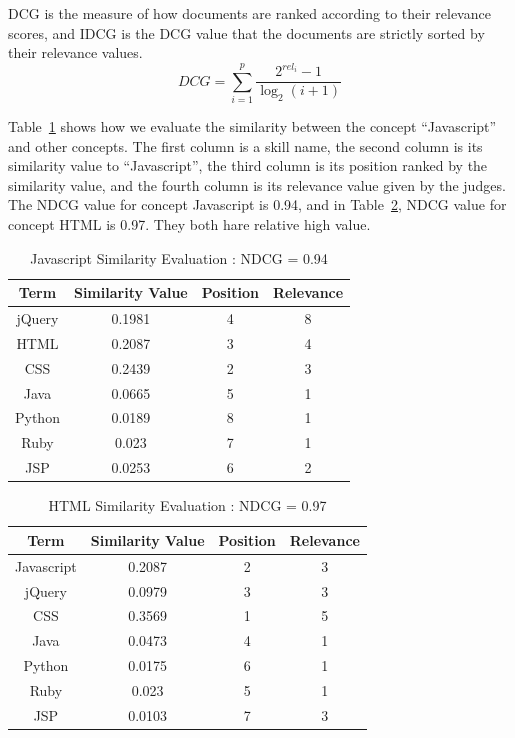 DCG is the measure of how documents are ranked according to their relevance scores, and IDCG is the DCG value that the documents are strictly sorted by their relevance values.
$$DCG =  \sum_{i=1}^{p} \frac {2^{rel_i} - 1}{\log_2(i+1)} $$

Table~\ref{tab:simcompare1} shows how we evaluate the similarity between the concept ``Javascript'' and other concepts. The first column is a skill name, the second column is its similarity value to ``Javascript'', the third column is its position ranked by the similarity value, and the fourth column is its relevance value given by the judges. The NDCG value for concept Javascript is 0.94, and in Table~\ref{tab:simcompare2},  NDCG value for concept HTML is 0.97. They both hare relative high value.

\begin{table}
\centering
\caption{ Javascript Similarity Evaluation : NDCG = 0.94 }
\begin{tabular}{ | c | c | c  | c |  }
 \hline
    Term     &  Similarity Value  &  Position   & Relevance     \\  \hline
    jQuery   &  0.1981            &      4      &   8        \\
     HTML    &  0.2087            &      3      &   4         \\
     CSS     &  0.2439            &      2      &   3   \\
     Java    &  0.0665            &      5      &   1   \\
    Python   &  0.0189            &      8      &   1   \\
     Ruby    &  0.023             &      7      &   1    \\
     JSP     &  0.0253            &      6      &   2    \\
 \hline
\end{tabular}
\label{tab:simcompare1}
\end{table}


\begin{table}
\centering
\caption{ HTML Similarity Evaluation : NDCG = 0.97 }
\begin{tabular}{ | c | c | c  | c |  }
 \hline
    Term      &  Similarity Value  &  Position   & Relevance     \\  \hline
  Javascript   &  0.2087           &      2      &   3        \\
     jQuery    &  0.0979           &      3      &   3         \\
     CSS     &  0.3569             &      1      &   5   \\
     Java    &  0.0473             &      4      &   1   \\
    Python   &  0.0175             &      6      &   1   \\
     Ruby    &  0.023              &      5      &   1    \\
     JSP     &  0.0103             &      7      &   3    \\
 \hline
\end{tabular}
\label{tab:simcompare2}
\end{table}

